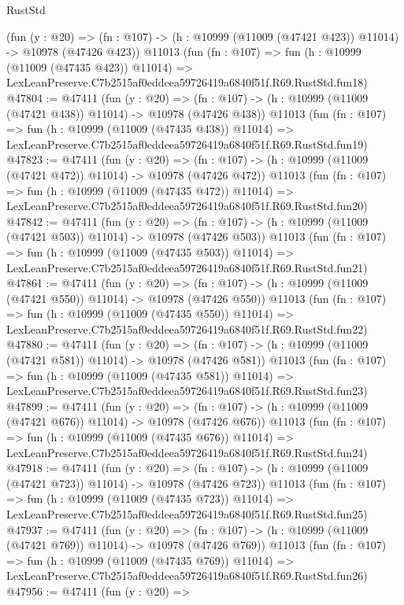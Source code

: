 \begin{lexlean}{RustStd}
\begin{coremodule}
    (fun (y : @20) =>
    (fn : @107) -> (h : @10999 (@11009 (@47421 @423)) @11014) -> @10978 (@47426 @423))
    @11013
    (fun (fn : @107) =>
    fun (h : @10999 (@11009 (@47435 @423)) @11014) =>
    LexLeanPreserve.C7b2515af0eddeea59726419a6840f51f.R69.RustStd.fun18)
@47804 := @47411
    (fun (y : @20) =>
    (fn : @107) -> (h : @10999 (@11009 (@47421 @438)) @11014) -> @10978 (@47426 @438))
    @11013
    (fun (fn : @107) =>
    fun (h : @10999 (@11009 (@47435 @438)) @11014) =>
    LexLeanPreserve.C7b2515af0eddeea59726419a6840f51f.R69.RustStd.fun19)
@47823 := @47411
    (fun (y : @20) =>
    (fn : @107) -> (h : @10999 (@11009 (@47421 @472)) @11014) -> @10978 (@47426 @472))
    @11013
    (fun (fn : @107) =>
    fun (h : @10999 (@11009 (@47435 @472)) @11014) =>
    LexLeanPreserve.C7b2515af0eddeea59726419a6840f51f.R69.RustStd.fun20)
@47842 := @47411
    (fun (y : @20) =>
    (fn : @107) -> (h : @10999 (@11009 (@47421 @503)) @11014) -> @10978 (@47426 @503))
    @11013
    (fun (fn : @107) =>
    fun (h : @10999 (@11009 (@47435 @503)) @11014) =>
    LexLeanPreserve.C7b2515af0eddeea59726419a6840f51f.R69.RustStd.fun21)
@47861 := @47411
    (fun (y : @20) =>
    (fn : @107) -> (h : @10999 (@11009 (@47421 @550)) @11014) -> @10978 (@47426 @550))
    @11013
    (fun (fn : @107) =>
    fun (h : @10999 (@11009 (@47435 @550)) @11014) =>
    LexLeanPreserve.C7b2515af0eddeea59726419a6840f51f.R69.RustStd.fun22)
@47880 := @47411
    (fun (y : @20) =>
    (fn : @107) -> (h : @10999 (@11009 (@47421 @581)) @11014) -> @10978 (@47426 @581))
    @11013
    (fun (fn : @107) =>
    fun (h : @10999 (@11009 (@47435 @581)) @11014) =>
    LexLeanPreserve.C7b2515af0eddeea59726419a6840f51f.R69.RustStd.fun23)
@47899 := @47411
    (fun (y : @20) =>
    (fn : @107) -> (h : @10999 (@11009 (@47421 @676)) @11014) -> @10978 (@47426 @676))
    @11013
    (fun (fn : @107) =>
    fun (h : @10999 (@11009 (@47435 @676)) @11014) =>
    LexLeanPreserve.C7b2515af0eddeea59726419a6840f51f.R69.RustStd.fun24)
@47918 := @47411
    (fun (y : @20) =>
    (fn : @107) -> (h : @10999 (@11009 (@47421 @723)) @11014) -> @10978 (@47426 @723))
    @11013
    (fun (fn : @107) =>
    fun (h : @10999 (@11009 (@47435 @723)) @11014) =>
    LexLeanPreserve.C7b2515af0eddeea59726419a6840f51f.R69.RustStd.fun25)
@47937 := @47411
    (fun (y : @20) =>
    (fn : @107) -> (h : @10999 (@11009 (@47421 @769)) @11014) -> @10978 (@47426 @769))
    @11013
    (fun (fn : @107) =>
    fun (h : @10999 (@11009 (@47435 @769)) @11014) =>
    LexLeanPreserve.C7b2515af0eddeea59726419a6840f51f.R69.RustStd.fun26)
@47956 := @47411
    (fun (y : @20) =>

\end{coremodule}
\end{lexlean}
